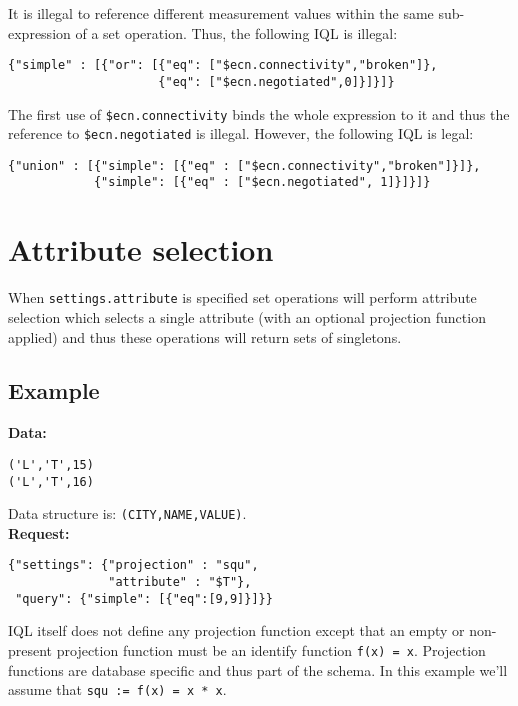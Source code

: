 \documentclass[a4paper]{article}
\begin{document}
It is illegal to reference different measurement values within the
same sub-expression of a set operation. Thus, the following IQL is
illegal:

\begin{verbatim}
{"simple" : [{"or": [{"eq": ["$ecn.connectivity","broken"]},
                     {"eq": ["$ecn.negotiated",0]}]}]}
\end{verbatim}

The first use of
\verb|$ecn.connectivity| binds the whole expression to it and thus the
reference to \verb|$ecn.negotiated| is illegal. However, the following
IQL is legal:

\begin{verbatim}
{"union" : [{"simple": [{"eq" : ["$ecn.connectivity","broken"]}]},
            {"simple": [{"eq" : ["$ecn.negotiated", 1]}]}]}
\end{verbatim}

\section{Attribute selection}

When \verb|settings.attribute| is specified set operations will
perform attribute selection which selects a single attribute (with an
optional projection function applied) and thus these operations will
return sets of singletons.

\subsection{Example}

\textbf{Data:}

\begin{verbatim}
('L','T',15)
('L','T',16)
\end{verbatim}

Data structure is: \verb|(CITY,NAME,VALUE)|. \\

\textbf{Request:}

\begin{verbatim}
{"settings": {"projection" : "squ",
              "attribute" : "$T"},
 "query": {"simple": [{"eq":[9,9]}]}}
\end{verbatim}

IQL itself does not define any projection function except that an
empty or non-present projection function must be an identify function
\verb|f(x) = x|.
Projection functions are database specific and thus part of the schema. In this example we'll assume that \verb|squ := f(x) = x * x|. \\
\end{document}
